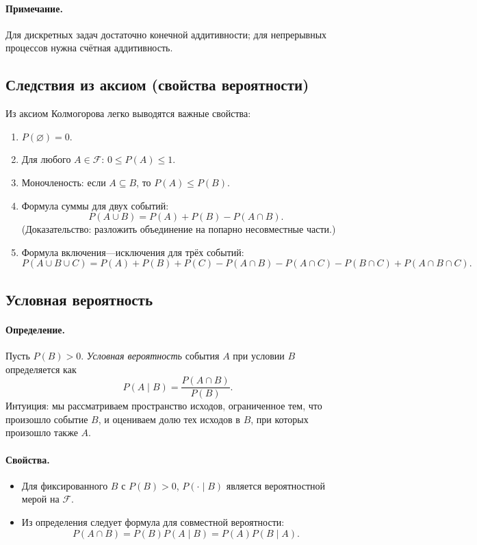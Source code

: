 \paragraph{Примечание.} Для дискретных задач достаточно конечной аддитивности; для непрерывных процессов нужна счётная аддитивность.

\subsection{Следствия из аксиом (свойства вероятности)}
Из аксиом Колмогорова легко выводятся важные свойства:
\begin{enumerate}
  \item $P(\varnothing)=0$.
  \item Для любого $A\in\mathcal{F}$: $0\le P(A)\le 1$.
  \item Моночленость: если $A\subseteq B$, то $P(A)\le P(B)$.
  \item Формула суммы для двух событий:
  \[
  P(A\cup B) = P(A) + P(B) - P(A\cap B).
  \]
  (Доказательство: разложить объединение на попарно несовместные части.)
  \item Формула включения—исключения для трёх событий:
  \[
  P(A\cup B\cup C) = P(A)+P(B)+P(C)-P(A\cap B)-P(A\cap C)-P(B\cap C)+P(A\cap B\cap C).
  \]
\end{enumerate}

\subsection{Условная вероятность}
\paragraph{Определение.} Пусть $P(B)>0$. \emph{Условная вероятность} события $A$ при условии $B$ определяется как
\[
P(A\mid B) = \frac{P(A\cap B)}{P(B)}.
\]
Интуиция: мы рассматриваем пространство исходов, ограниченное тем, что произошло событие $B$, и оцениваем долю тех исходов в $B$, при которых произошло также $A$.

\paragraph{Свойства.}
\begin{itemize}
  \item Для фиксированного $B$ с $P(B)>0$, $P(\cdot\mid B)$ является вероятностной мерой на $\mathcal{F}$.
  \item Из определения следует формула для совместной вероятности:
  \[
  P(A\cap B) = P(B) P(A\mid B) = P(A) P(B\mid A).
  \]
\end{itemize}

